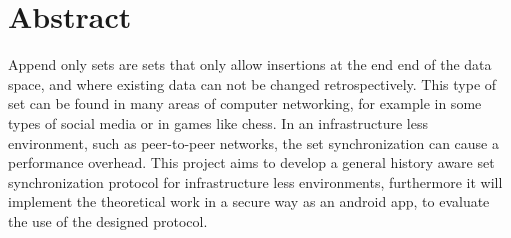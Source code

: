 \chapter{Abstract}

Append only sets are sets that only allow insertions at the end end of the data space, and where existing data can not be changed retrospectively. This type of set can be found in many areas of computer networking, for example in some types of social media or in games like chess. In an infrastructure less environment, such as peer-to-peer networks, the set synchronization can cause a performance overhead. This project aims to develop a general history aware set synchronization protocol for infrastructure less environments, furthermore it will implement the theoretical work in a secure way as an android app, to evaluate the use of the designed protocol. 
